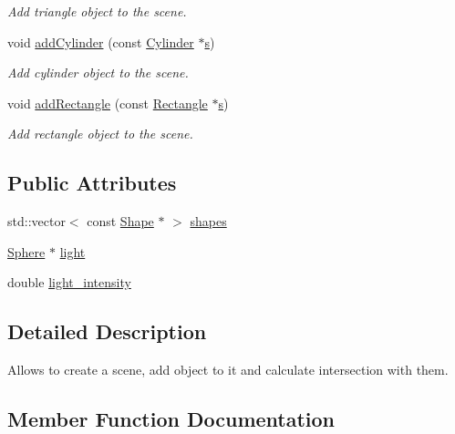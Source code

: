 \begin{DoxyCompactItemize}
\begin{DoxyCompactList}\small\item\em Add triangle object to the scene. \end{DoxyCompactList}\item 
void \hyperlink{classScene_ab0c2696e58d79a68f76073dd6f7fb9b7}{add\+Cylinder} (const \hyperlink{classCylinder}{Cylinder} $\ast$\hyperlink{test_8cpp_aecc1396fc611f6e71d5d70228e7b089a}{s})
\begin{DoxyCompactList}\small\item\em Add cylinder object to the scene. \end{DoxyCompactList}\item 
void \hyperlink{classScene_a926114a1fed32caabbc716c213e70637}{add\+Rectangle} (const \hyperlink{classRectangle}{Rectangle} $\ast$\hyperlink{test_8cpp_aecc1396fc611f6e71d5d70228e7b089a}{s})
\begin{DoxyCompactList}\small\item\em Add rectangle object to the scene. \end{DoxyCompactList}\end{DoxyCompactItemize}
\subsection*{Public Attributes}
\begin{DoxyCompactItemize}
\item 
std\+::vector$<$ const \hyperlink{classShape}{Shape} $\ast$ $>$ \hyperlink{classScene_aff4c301d0f6f9fccbbc60859e6f40749}{shapes}
\item 
\hyperlink{classSphere}{Sphere} $\ast$ \hyperlink{classScene_a3bcb1d5f1d3f81df9d5f4a69933fa353}{light}
\item 
double \hyperlink{classScene_a4ddb7fa3ea0fab202f34b48450f5bf2b}{light\+\_\+intensity}
\end{DoxyCompactItemize}


\subsection{Detailed Description}
Allows to create a scene, add object to it and calculate intersection with them. 

\subsection{Member Function Documentation}
\mbox{\label{classScene_ab0c2696e58d79a68f76073dd6f7fb9b7}} 
